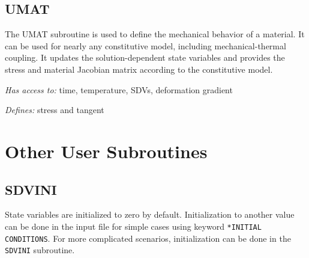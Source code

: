 \documentclass[10pt,letterpaper,oneside]{report}
\begin{document}



\subsection{UMAT}
The UMAT subroutine is used to define the mechanical behavior of a material.  It can be used for nearly any constitutive model, including mechanical-thermal coupling.  It updates the solution-dependent state variables and provides the stress and material Jacobian matrix according to the constitutive model.  

\emph{Has access to:} time, temperature, SDVs, deformation gradient

\emph{Defines:} stress and tangent





\newpage
\section{Other User Subroutines}

\subsection{SDVINI}
State variables are initialized to zero by default.  Initialization to another value can be done in the input file for simple cases using keyword \texttt{*INITIAL CONDITIONS}.  For more complicated scenarios, initialization can be done in the \texttt{SDVINI} subroutine.
\end{document}
